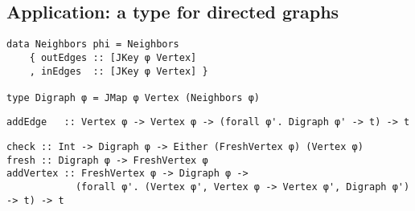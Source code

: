 \documentclass[format=sigplan, review=false, screen=true]{acmart}
\begin{document}

\begin{figure*}
  \begin{minipage}{0.48\textwidth}
    \inputminted{haskell}{justified.hs}
  \end{minipage}
  \begin{minipage}{0.48\textwidth}
    \inputminted{haskell}{justified-usage.hs}
  \end{minipage}
\end{figure*}

\subsection{Application: a type for directed graphs}

\begin{verbatim}
data Neighbors phi = Neighbors
    { outEdges :: [JKey φ Vertex]
    , inEdges  :: [JKey φ Vertex] }
  
type Digraph φ = JMap φ Vertex (Neighbors φ)
\end{verbatim}

\begin{verbatim}
addEdge   :: Vertex φ -> Vertex φ -> (forall φ'. Digraph φ' -> t) -> t
\end{verbatim}


\begin{verbatim}
check :: Int -> Digraph φ -> Either (FreshVertex φ) (Vertex φ)
fresh :: Digraph φ -> FreshVertex φ
addVertex :: FreshVertex φ -> Digraph φ ->
            (forall φ'. (Vertex φ', Vertex φ -> Vertex φ', Digraph φ') -> t) -> t
\end{verbatim}
\end{document}
